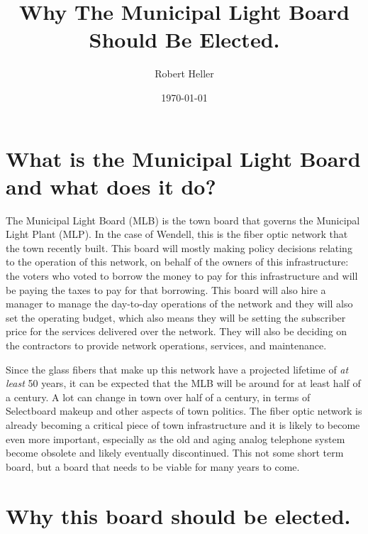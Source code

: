 \documentclass[12pt]{article}
\title{Why The Municipal Light Board Should Be Elected.}
\author{Robert Heller}
\date{\today}
\begin{document}
        
\maketitle

\tableofcontents

\section{What is the Municipal Light Board and what does it do?}

The Municipal Light Board (MLB) is the town board that governs the Municipal
Light Plant (MLP). In the case of Wendell, this is the fiber optic network
that the town recently built. This board will mostly making policy decisions
relating to the operation of this network, on behalf of the owners of this
infrastructure: the voters who voted to borrow the money to pay for this
infrastructure and will be paying the taxes to pay for that borrowing. This
board will also hire a manager to manage the day-to-day operations of the
network and they will also set the operating budget, which also means they
will be setting the subscriber price for the services delivered over the
network. They will also be deciding on the contractors to provide network 
operations, services, and maintenance.

Since the glass fibers that make up this network have a projected lifetime of
\textit{at least} 50 years, it can be expected that the MLB will be around for
at least half of a century. A lot can change in town over half of a century,
in terms of Selectboard makeup and other aspects of town politics. The fiber
optic network is already becoming a critical piece of town infrastructure and 
it is likely to become even more important, especially as the old and aging 
analog telephone system become obsolete and likely eventually discontinued.  
This not some short term board, but a board that needs to be viable for many 
years to come.

\section{Why this board should be elected.}
\end{document}
